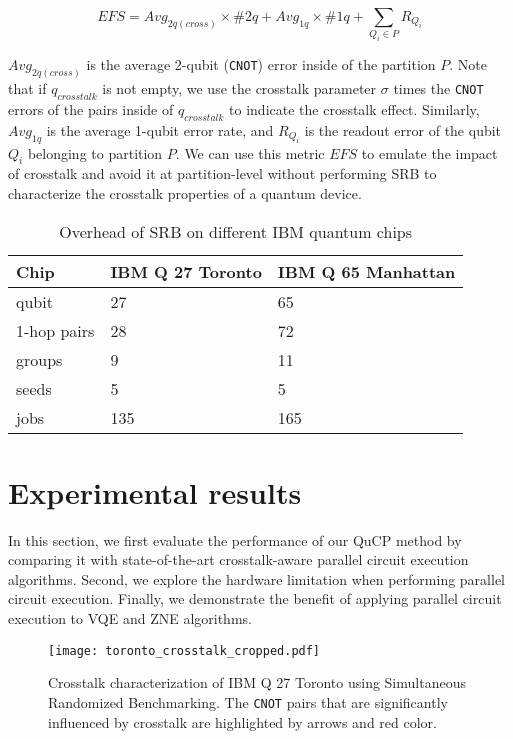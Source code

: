 \documentclass[conference]{IEEEtran}
\begin{document}
\begin{equation}
	EFS = Avg_{2q(cross)} \times \#2q + Avg_{1q} \times \#1q + \sum_{Q_i \in P} R_{Q_i}
\label{EFS}
\end{equation}

$Avg_{2q(cross)}$ is the average 2-qubit (\texttt{CNOT}) error inside of the partition $P$. Note that if $q_{crosstalk}$ is not empty, we use the crosstalk parameter $\sigma$ times the \texttt{CNOT} errors of the pairs inside of $q_{crosstalk}$ to indicate the crosstalk effect. Similarly, $Avg_{1q}$ is the average 1-qubit error rate, and $R_{Q_i}$ is the readout error of the qubit $Q_i$ belonging to partition $P$. We can use this metric $EFS$ to emulate the impact of crosstalk and avoid it at partition-level without performing SRB to characterize the crosstalk properties of a quantum device.


\begin{table}
\caption{Overhead of SRB on different IBM quantum chips}
\label{table1}
\begin{center}
\begin{tabular}{|l|l|l|}
	\hline
	\textbf{Chip} & \textbf{IBM Q 27 Toronto} & \textbf{IBM Q 65 Manhattan} \\
	\hline
	qubit & 27 & 65\\
	\hline
	1-hop pairs & 28 & 72\\
	\hline
	groups & 9 & 11\\
	\hline
	seeds & 5 & 5\\
	\hline
	jobs & 135 & 165\\
	\hline
\end{tabular}
\end{center}
\end{table}


\section{Experimental results}
In this section, we first evaluate the performance of our QuCP method by comparing it with state-of-the-art crosstalk-aware parallel circuit execution algorithms. Second, we explore the hardware limitation when performing parallel circuit execution. Finally, we demonstrate the benefit of applying parallel circuit execution to VQE and ZNE algorithms.


\begin{figure}[t]
\centering
\texttt{[image: toronto\_crosstalk\_cropped.pdf]}
\caption{Crosstalk characterization of IBM Q 27 Toronto using Simultaneous Randomized Benchmarking. The \texttt{CNOT} pairs that are significantly influenced by crosstalk are highlighted by arrows and red color.}
\label{fig:toronto_crosstalk}
\end{figure}
\end{document}
